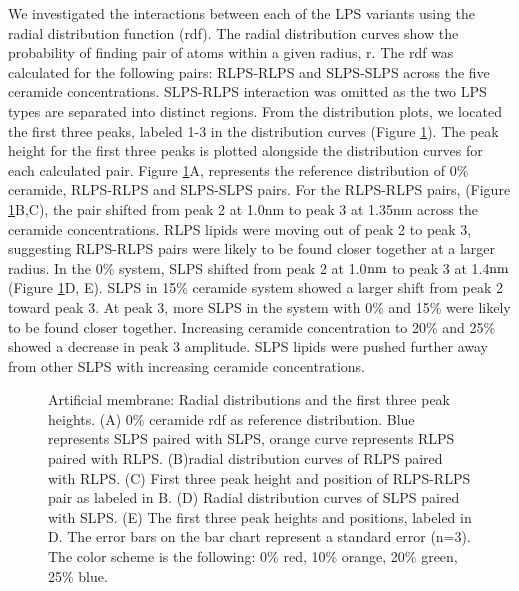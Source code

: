 \documentclass[10pt, letterpaper]{article}
\begin{document}

We investigated the interactions between each of the LPS variants using the radial distribution function (rdf). The radial distribution curves show the probability of finding pair of atoms within a given radius, r. The rdf was calculated for the following pairs: RLPS-RLPS and SLPS-SLPS across the five ceramide concentrations. SLPS-RLPS interaction was omitted as the two LPS types are separated into distinct regions. 
From the distribution plots, we located the first three peaks, labeled 1-3 in the distribution curves (Figure \ref{fig:art_radial_dist}). The peak height for the first three peaks is plotted alongside the distribution curves for each calculated pair. Figure \ref{fig:art_radial_dist}A, represents the reference distribution of 0\% ceramide, RLPS-RLPS and SLPS-SLPS pairs. For the RLPS-RLPS pairs, (Figure \ref{fig:art_radial_dist}B,C), the pair shifted from peak 2 at 1.0nm to peak 3 at 1.35nm across the ceramide concentrations. RLPS lipids were moving out of peak 2 to peak 3, suggesting RLPS-RLPS pairs were likely to be found closer together at a larger radius. In the 0\% system, SLPS shifted from peak 2 at 1.0$\rm nm$ to peak 3 at 1.4$\rm nm$ (Figure \ref{fig:art_radial_dist}D, E). SLPS in 15\% ceramide system showed a larger shift from peak 2 toward peak 3. At peak 3, more SLPS in the system with 0\% and 15\% were likely to be found closer together. Increasing ceramide concentration to 20\% and 25\% showed a decrease in peak 3 amplitude. SLPS lipids were pushed further away from other SLPS with increasing ceramide concentrations.


\begin{figure}[H]
  \centering
  \qquad
  \qquad
  \caption[Artificial Membrane: Radial Distribution Function]{Artificial membrane: Radial distributions and the first three peak heights. (A) 0\% ceramide rdf as reference distribution. Blue represents SLPS paired with SLPS, orange curve represents RLPS paired with RLPS. 
  (B)radial distribution curves of RLPS paired with RLPS. (C) First three peak height and position of RLPS-RLPS pair as labeled in B. (D) Radial distribution curves of SLPS paired with SLPS. (E) The first three peak heights and positions, labeled in D. The error bars on the bar chart represent a standard error (n=3). The color scheme is the following: 0\% red, 10\% orange, 20\% green, 25\% blue.
  }\label{fig:art_radial_dist}
\end{figure}
\end{document}
